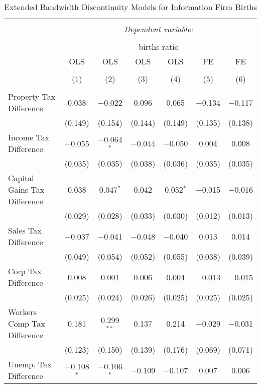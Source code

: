 
\begin{table}[!htbp] \centering 
  \caption{Extended Bandwidth Discontinuity Models for  Information Firm Births} 
  \label{51eb} 
\footnotesize 
\begin{tabular}{@{\extracolsep{5pt}}lcccccc} 
\\[-1.8ex]\hline 
\hline \\[-1.8ex] 
 & \multicolumn{6}{c}{\textit{Dependent variable:}} \\ 
\cline{2-7} 
\\[-1.8ex] & \multicolumn{6}{c}{births ratio} \\ 
 & OLS & OLS & OLS & OLS & FE & FE \\ 
\\[-1.8ex] & (1) & (2) & (3) & (4) & (5) & (6)\\ 
\hline \\[-1.8ex] 
 Property Tax Difference & 0.038 & $-$0.022 & 0.096 & 0.065 & $-$0.134 & $-$0.117 \\ 
  & (0.149) & (0.154) & (0.144) & (0.149) & (0.135) & (0.138) \\ 
  Income Tax Difference & $-$0.055 & $-$0.064$^{*}$ & $-$0.044 & $-$0.050 & 0.004 & 0.008 \\ 
  & (0.035) & (0.035) & (0.038) & (0.036) & (0.035) & (0.035) \\ 
  Capital Gains Tax Difference & 0.038 & 0.047$^{*}$ & 0.042 & 0.052$^{*}$ & $-$0.015 & $-$0.016 \\ 
  & (0.029) & (0.028) & (0.033) & (0.030) & (0.012) & (0.013) \\ 
  Sales Tax Difference & $-$0.037 & $-$0.041 & $-$0.048 & $-$0.040 & 0.013 & 0.014 \\ 
  & (0.049) & (0.054) & (0.052) & (0.055) & (0.038) & (0.039) \\ 
  Corp Tax Difference & 0.008 & 0.001 & 0.006 & 0.004 & $-$0.013 & $-$0.015 \\ 
  & (0.025) & (0.024) & (0.026) & (0.025) & (0.025) & (0.025) \\ 
  Workers Comp Tax Difference & 0.181 & 0.299$^{**}$ & 0.137 & 0.214 & $-$0.029 & $-$0.031 \\ 
  & (0.123) & (0.150) & (0.139) & (0.176) & (0.069) & (0.071) \\ 
  Unemp. Tax Difference & $-$0.108$^{*}$ & $-$0.106$^{*}$ & $-$0.109 & $-$0.107 & 0.007 & 0.006 \\ 

\end{tabular}
\end{table}
